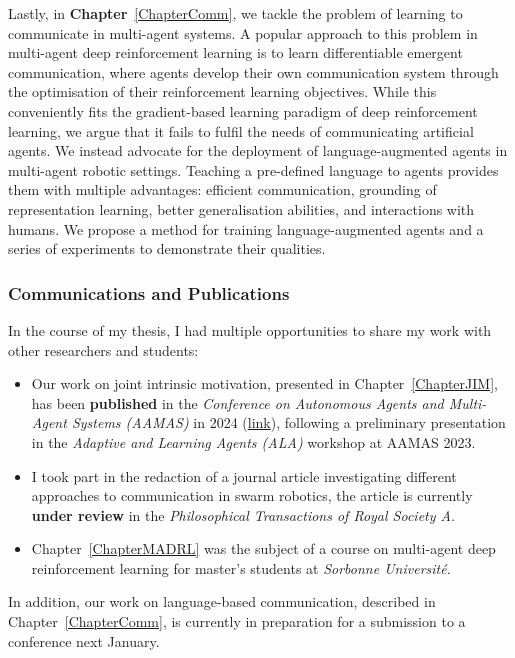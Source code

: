 Lastly, in \textbf{Chapter}~\ref{ChapterComm}, we tackle the problem of learning to communicate in multi-agent systems. A popular approach to this problem in multi-agent deep reinforcement learning is to learn differentiable emergent communication, where agents develop their own communication system through the optimisation of their reinforcement learning objectives. While this conveniently fits the gradient-based learning paradigm of deep reinforcement learning, we argue that it fails to fulfil the needs of communicating artificial agents. We instead advocate for the deployment of language-augmented agents in multi-agent robotic settings. Teaching a pre-defined language to agents provides them with multiple advantages: efficient communication, grounding of representation learning, better generalisation abilities, and interactions with humans. We propose a method for training language-augmented agents and a series of experiments to demonstrate their qualities. 


\subsubsection{Communications and Publications}

In the course of my thesis, I had multiple opportunities to share my work with other researchers and students:
\begin{itemize}
    \item Our work on joint intrinsic motivation, presented in Chapter~\ref{ChapterJIM}, has been \textbf{published} in the \textit{Conference on Autonomous Agents and Multi-Agent Systems (AAMAS)} in 2024 (\href{https://dl.acm.org/doi/abs/10.5555/3635637.3663214}{link}), following a preliminary presentation in the \textit{Adaptive and Learning Agents (ALA)} workshop at AAMAS 2023.
    \item I took part in the redaction of a journal article investigating different approaches to communication in swarm robotics, the article is currently \textbf{under review} in the \textit{Philosophical Transactions of Royal Society A}.
    \item Chapter~\ref{ChapterMADRL} was the subject of a course on multi-agent deep reinforcement learning for master's students at \textit{Sorbonne Université}.
\end{itemize}
In addition, our work on language-based communication, described in Chapter~\ref{ChapterComm}, is currently in preparation for a submission to a conference next January. 
